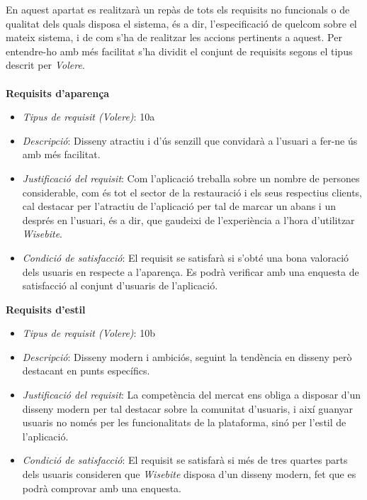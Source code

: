 En aquest apartat es realitzarà un repàs de tots els requisits no funcionals\cite{requisito} o de qualitat dels quals disposa el sistema, és a dir, l'especificació de quelcom sobre el mateix sistema, i de com s'ha de realitzar les accions pertinents a aquest. Per entendre-ho amb més facilitat s'ha dividit el conjunt de requisits segons el tipus descrit per \textit{Volere}\cite{volere}.
\\\\
\noindent\textbf{Requisits d'aparença}
\begin{itemize}
\item \textit{Tipus de requisit (Volere)}: 10a
\item \textit{Descripció}: Disseny atractiu i d'ús senzill que convidarà a l'usuari a fer-ne ús amb més facilitat.
\item \textit{Justificació del requisit}: Com l'aplicació treballa sobre un nombre de persones considerable, com és tot el sector de la restauració i els seus respectius clients, cal destacar per l'atractiu de l'aplicació per tal de marcar un abans i un després en l'usuari, és a dir, que gaudeixi de l'experiència a l'hora d'utilitzar \textit{Wisebite}.
\item \textit{Condició de satisfacció}: El requisit se satisfarà si s'obté una bona valoració dels usuaris en respecte a l'aparença. Es podrà verificar amb una enquesta de satisfacció al conjunt d'usuaris de l'aplicació.
\end{itemize}

\noindent\textbf{Requisits d'estil}
\begin{itemize}
\item \textit{Tipus de requisit (Volere)}: 10b
\item \textit{Descripció}: Disseny modern i ambiciós, seguint la tendència en disseny però destacant en punts específics.
\item \textit{Justificació del requisit}: La competència del mercat ens obliga a disposar d'un disseny modern per tal destacar sobre la comunitat d'usuaris, i així guanyar usuaris no només per les funcionalitats de la plataforma, sinó per l'estil de l'aplicació.
\item \textit{Condició de satisfacció}: El requisit se satisfarà si més de tres quartes parts dels usuaris consideren que \textit{Wisebite} disposa d'un disseny modern, fet que es podrà comprovar amb una enquesta.
\end{itemize}

